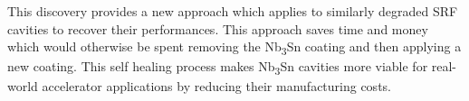 This discovery provides a new approach which applies to similarly degraded SRF cavities to recover their performances. This approach saves time and money which would otherwise be spent removing the Nb\textsubscript{3}Sn coating and then applying a new coating. This self healing process makes Nb\textsubscript{3}Sn cavities more viable for real-world accelerator applications by reducing their manufacturing costs.
